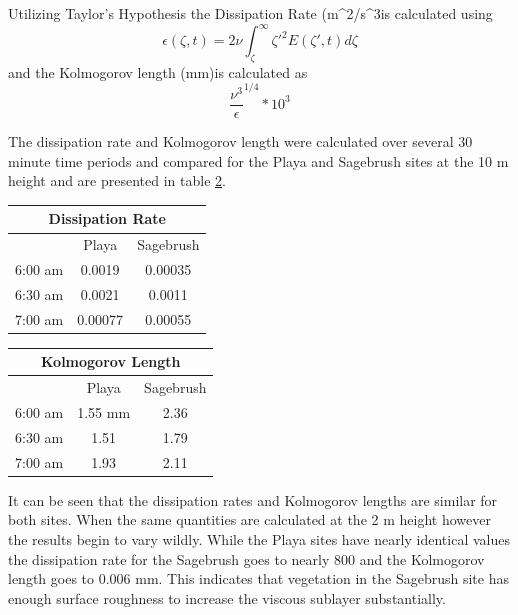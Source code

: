 \documentclass[]{article}
\begin{document}
Utilizing Taylor's Hypothesis the Dissipation Rate (m^2/s^3is calculated using 
\begin{equation} \label{eq:diss}
\epsilon (\zeta ,t) = 2\nu \int_{\zeta}^{\infty} \zeta '^2E(\zeta ',t)d\zeta 
\end{equation}
and the Kolmogorov length (mm)is calculated as 
\begin{equation} \label{eq:kolm_length}
\frac{\nu^3}{\epsilon}^{1/4}*10^3
\end{equation}

The dissipation rate and Kolmogorov length were calculated over several 30 minute time periods and compared for the Playa and Sagebrush sites at the 10 m height and are presented in table \ref{tbl:diss}. 
\begin{table}[h] \label{tbl:diss}
\begin{minipage}[b]{0.45\linewidth}
\centering
\begin{tabular}{|c||c|c|}
	\hline
	\multicolumn{3}{|c|}{Dissipation Rate} \\
	\hline
	& Playa & Sagebrush \\
	\hline
	6:00 am & 0.0019 & 0.00035 \\
	6:30 am & 0.0021 & 0.0011 \\
	7:00 am & 0.00077 & 0.00055 \\
	\hline
\end{tabular}
\end{minipage}%
\begin{minipage}[b]{0.45\linewidth}
\centering
\begin{tabular}{|c||c|c|}
	\hline
	\multicolumn{3}{|c|}{Kolmogorov Length} \\
	\hline
	& Playa & Sagebrush \\
	\hline
	6:00 am & 1.55 mm & 2.36 \\
	6:30 am & 1.51 & 1.79 \\
	7:00 am & 1.93 & 2.11 \\
	\hline
\end{tabular}
\end{minipage}%
\end{table}
It can be seen that the dissipation rates and Kolmogorov lengths are similar for both sites. When the same quantities are calculated at the 2 m height however the results begin to vary wildly. While the Playa sites have nearly identical values the dissipation rate for the Sagebrush goes to nearly 800 and the Kolmogorov length goes to 0.006 mm. This indicates that vegetation in the Sagebrush site has enough surface roughness to increase the viscous sublayer substantially. 
\end{document}
